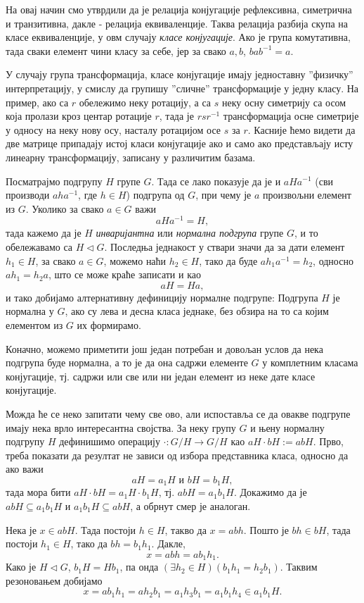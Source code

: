 \documentclass{report}
\theoremstyle{plain}
\theoremstyle{definition}
\begin{document}
На овај начин смо утврдили да је релација конјугације рефлексивна, симетрична и транзитивна, дакле - релација еквиваленције. Таква релација разбија скупа на класе еквиваленције, у овм случају \emph{класе конјугације}. Ако је група комутативна, тада сваки елемент чини класу за себе, јер за свако $a, b$, $bab^{-1} = a$.

У случају група трансформација, класе конјугације имају једноставну ''физичку'' интерпретацију, у смислу да групишу ''сличне'' трансформације у једну класу. На пример, ако са $r$ обележимо неку ротацију, а са $s$ неку осну симетрију са осом која пролази кроз центар ротације $r$, тада је $r s r^{-1}$ трансформација осне симетрије у односу на неку нову осу, насталу ротацијом осе $s$ за $r$. Касније ћемо видети да две матрице припадају истој класи конјугације ако и само ако представљају исту линеарну трансформацију, записану у различитим базама.

Посматрајмо подгрупу $H$ групе $G$. Тада се лако показује да је и $aHa^{-1}$ (сви производи $aha^{-1}$, где $h\in H$) подгрупа од $G$, при чему је $a$ произвољни елемент из $G$. Уколико за свако $a\in G$ важи
$$aHa^{-1} = H,$$
тада кажемо да је $H$ \emph{инваријантна} или \emph{нормална подгрупа} групе $G$, и то обележавамо са $H\lhd G$. Последња једнакост у ствари значи да за дати елемент $h_1\in H$, за свако $a\in G$, можемо наћи $h_2\in H$, тако да буде $ah_1a^{-1} = h_2$, односно $ah_1 = h_2 a$, што се може краће записати и као
$$aH = Ha, $$
и тако добијамо алтернативну дефиницију нормалне подгрупе: Подгрупа $H$ је нормална у $G$, ако су лева и десна класа једнаке, без обзира на то са којим елементом из $G$ их формирамо.

Коначно, можемо приметити још један потребан и довољан услов да нека подгрупа буде нормална, а то је да она садржи елементе $G$ у комплетним класама конјугације, тј. садржи или све или ни један елемент из неке дате класе конјугације.

Можда ће се неко запитати чему све ово, али испоставља се да овакве подгрупе имају нека врло интересантна својства. За неку групу $G$ и њену нормалну подгрупу $H$ дефинишимо операцију $\cdot: G/H \to G/H$ као $aH\cdot bH := abH$. Прво, треба показати да резултат не зависи од избора представника класа, односно да ако важи
$$aH = a_1 H \text{ и } bH = b_1 H,$$
тада мора бити $aH\cdot bH = a_1 H \cdot b_1 H$, тј. $abH = a_1 b_1 H$. Докажимо да је $abH \subseteq a_1 b_1 H$ и $a_1 b_1 H \subseteq abH$, а обрнут смер је аналоган. 

Нека је $x\in abH$. Тада постоји $h\in H$, такво да $x=abh$. Пошто је $bh\in bH$, тада постоји $h_1\in H$, тако да $bh = b_1 h_1$. Дакле,
$$x = abh = ab_1 h_1.$$
Како је $H\lhd G$, $b_1 H = Hb_1$, па онда $(\exists h_2\in H)(b_1h_1=h_2b_1)$. Таквим резоновањем добијамо
$$x = ab_1h_1 = ah_2b_1 = a_1h_3b_1 = a_1b_1h_4 \in a_1b_1H.$$
\end{document}
